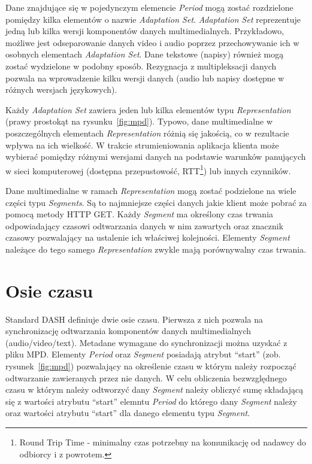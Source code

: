 Dane znajdujące się w pojedynczym elemencie \textit{Period} mogą zostać rozdzielone pomiędzy kilka elementów o nazwie \textit{Adaptation Set}. \textit{Adaptation Set} reprezentuje jedną lub kilka wersji komponentów danych multimedialnych. Przykładowo, możliwe jest odseparowanie danych video i audio poprzez przechowywanie ich w osobnych elementach \textit{Adaptation Set}. Dane tekstowe (napisy) również mogą zostać wydzielone w podobny sposób. Rezygnacja z multipleksacji danych pozwala na wprowadzenie kilku wersji danych (audio lub napisy dostępne w różnych wersjach językowych).

Każdy \textit{Adaptation Set} zawiera jeden lub kilka elementów typu \textit{Representation} (prawy prostokąt na rysunku~\ref{fig:mpd}). Typowo, dane multimedialne w poszczególnych elementach \textit{Representation} różnią się jakością, co w rezultacie wpływa na ich wielkość. W trakcie strumieniowania aplikacja klienta może wybierać pomiędzy różnymi wersjami danych na podstawie warunków panujących w sieci komputerowej (dostępna przepustowość, RTT\footnote{Round Trip Time - minimalny czas potrzebny na komunikację od nadawcy do odbiorcy i z powrotem.}) lub innych czynników.

Dane multimedialne w ramach \textit{Representation} mogą zostać podzielone na wiele części typu \textit{Segments}. Są to najmniejsze części danych jakie klient może pobrać za pomocą metody HTTP GET. Każdy \textit{Segment} ma określony czas trwania odpowiadający czasowi odtwarzania danych w nim zawartych oraz znacznik czasowy pozwalający na ustalenie ich właściwej kolejności. Elementy \textit{Segment} należące do tego samego \textit{Representation} zwykle mają porównywalny czas trwania.

\section{Osie czasu}

Standard DASH definiuje dwie osie czasu. Pierwsza z nich pozwala na synchronizację odtwarzania komponentów danych multimedialnych (audio/video/text). Metadane wymagane do synchronizacji można uzyskać z pliku MPD. Elementy \textit{Period} oraz \textit{Segment} posiadają atrybut ``start'' (zob. rysunek~\ref{fig:mpd}) pozwalający na określenie czasu w którym należy rozpocząć odtwarzanie zawieranych przez nie danych. W celu obliczenia bezwzględnego czasu w którym należy odtworzyć dany \textit{Segment} należy obliczyć sumę składającą się z wartości atrybutu ``start'' elemntu \textit{Period} do którego dany \textit{Segment} należy oraz wartości atrybutu ``start'' dla danego elementu typu \textit{Segment}.

